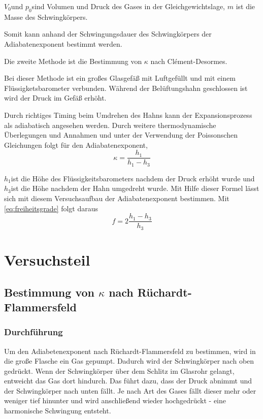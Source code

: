 $V_{0}$und $p_{0}$sind Volumen und Druck des Gases in der Gleichgewichtslage,
$m$ ist die Masse des Schwingkörpers.

Somit kann anhand der Schwingungsdauer des Schwingkörpers der Adiabatenexponent
bestimmt werden.

Die zweite Methode ist die Bestimmung von $\kappa$ nach Clément-Desormes.

Bei dieser Methode ist ein großes Glasgefäß mit Luftgefüllt und mit
einem Flüssigketsbarometer verbunden. Während der Belüftungshahn geschlossen
ist wird der Druck im Gefäß erhöht.

Durch richtiges Timing beim Umdrehen des Hahns kann der Expansionsprozess
als adiabatisch angesehen werden. Durch weitere thermodynamische Überlegungen
und Annahmen und unter der Verwendung der Poissonschen Gleichungen
folgt für den Adiabatenexponent,
\begin{equation}
\kappa=\frac{h_{1}}{h_{1}-h_{3}}\label{eq:adiabatenexponent2}
\end{equation}


$h_{1}$ist die Höhe des Flüssigkeitsbarometers nachdem der Druck
erhöht wurde und $h_{3}$ist die Höhe nachdem der Hahn umgedreht wurde.
Mit Hilfe dieser Formel lässt sich mit diesem Versuchsaufbau der Adiabatenexponent
bestimmen. Mit \eqref{eq:freiheitsgrade} folgt daraus
\begin{equation}
f = 2\frac{h_1 - h_3}{h_3}
\end{equation}
\newpage

\section{Versuchsteil}

\subsection{Bestimmung von $ \kappa $ nach Rüchardt-Flammersfeld}
\subsubsection{Durchführung}
Um den Adiabetenexponent nach Rüchardt-Flammersfeld zu bestimmen,
wird in die große Flasche ein Gas gepumpt. Dadurch wird der Schwingkörper
nach oben gedrückt. Wenn der Schwingkörper über dem Schlitz im Glasrohr
gelangt, entweicht das Gas dort hindurch. Das führt dazu, dass der
Druck abnimmt und der Schwingkörper nach unten fällt. Je nach Art
des Gases fällt dieser mehr oder weniger tief hinunter und wird anschließend
wieder hochgedrückt - eine harmonische Schwingung entsteht.

